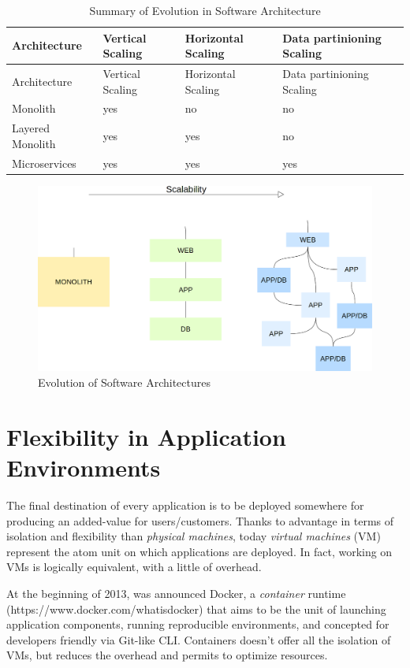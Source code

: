 \begin{longtable}[c]{@{}llll@{}}
\caption{Summary of Evolution in Software Architecture}\tabularnewline
\toprule
Architecture & Vertical Scaling & Horizontal Scaling & Data partinioning
Scaling\tabularnewline
\midrule
\endfirsthead
\toprule
Architecture & Vertical Scaling & Horizontal Scaling & Data partinioning
Scaling\tabularnewline
\midrule
\endhead
Monolith & yes & no & no\tabularnewline
Layered Monolith & yes & yes & no\tabularnewline
Microservices & yes & yes & yes\tabularnewline
\bottomrule
\end{longtable}

\begin{figure}[htbp]
\centering
\includegraphics{media/ch2-microservices.png}
\caption{Evolution of Software Architectures}
\end{figure}

\section{Flexibility in Application
Environments}\label{flexibility-in-application-environments}

The final destination of every application is to be deployed somewhere
for producing an added-value for users/customers. Thanks to advantage in
terms of isolation and flexibility than \emph{physical machines}, today
\emph{virtual machines} (VM) represent the atom unit on which
applications are deployed. In fact, working on VMs is logically
equivalent, with a little of overhead.

At the beginning of 2013, was announced Docker, a \emph{container}
runtime (https://www.docker.com/whatisdocker) that aims to be the unit
of launching application components, running reproducible environments,
and concepted for developers friendly via Git-like CLI. Containers
doesn't offer all the isolation of VMs, but reduces the overhead and
permits to optimize resources.


